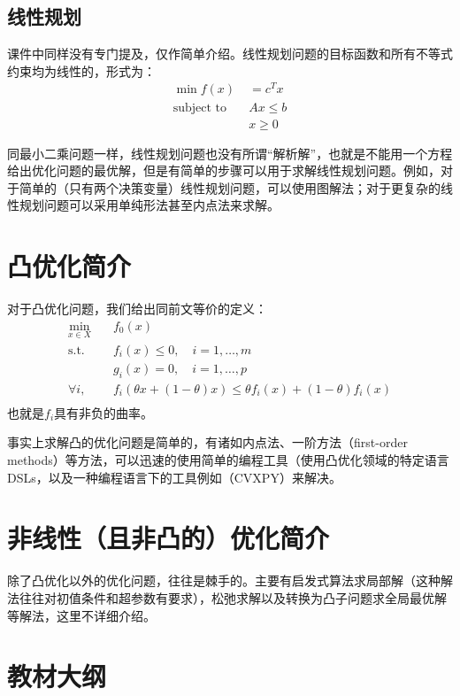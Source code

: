 \documentclass[12pt,a4paper]{book}
\begin{document}
\subsection{线性规划}
课件中同样没有专门提及，仅作简单介绍。线性规划问题的目标函数和所有不等式约束均为线性的，形式为：
\begin{align*}
\min f(x) &= c^Tx \\
\text{subject to} \quad & Ax \leq b \\
& x \geq 0
\end{align*}

同最小二乘问题一样，线性规划问题也没有所谓“解析解”，也就是不能用一个方程给出优化问题的最优解，但是有简单的步骤可以用于求解线性规划问题。例如，对于简单的（只有两个决策变量）线性规划问题，可以使用图解法；对于更复杂的线性规划问题可以采用单纯形法甚至内点法来求解。

\section{凸优化简介}

对于凸优化问题，我们给出同前文等价的定义：
\begin{align*}
\min_{x \in X} \quad &f_0(x) \\
\text{s.t.} \quad &f_i(x) \leq 0 ,\quad i = 1, \ldots, m \\
& g_i(x) = 0 ,\quad i = 1, \ldots, p \\
\forall i, \quad & f_i(\theta x + (1 - \theta)x) \leq \theta f_i(x) + (1 - \theta) f_i(x)  \\
\end{align*}
也就是$f_i$具有非负的曲率。

事实上求解凸的优化问题是简单的，有诸如内点法、一阶方法（first-order methods）等方法，可以迅速的使用简单的编程工具（使用凸优化领域的特定语言DSLs，以及一种编程语言下的工具例如（CVXPY）来解决。



\section{非线性（且非凸的）优化简介}

除了凸优化以外的优化问题，往往是棘手的。主要有启发式算法求局部解（这种解法往往对初值条件和超参数有要求），松弛求解以及转换为凸子问题求全局最优解等解法，这里不详细介绍。

\section{教材大纲}
\end{document}
